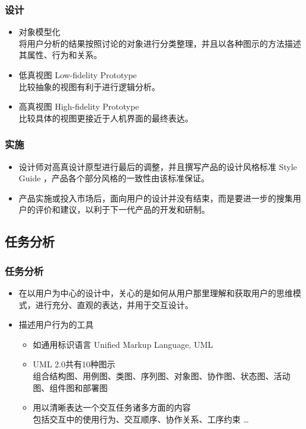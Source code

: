 \documentclass{beamer}
\begin{document}
\begin{frame}
	\frametitle{设计}
	\begin{itemize}
		\item 对象模型化\\{\tiny 将用户分析的结果按照讨论的对象进行分类整理，并且以各种图示的方法描述其属性、行为和关系。}
		\item 低真视图 Low-fidelity Prototype\\{\tiny 比较抽象的视图有利于进行逻辑分析。}
		\item 高真视图 High-fidelity Prototype\\{\tiny 比较具体的视图更接近于人机界面的最终表达。}
	\end{itemize}
\end{frame}

\begin{frame}
	\frametitle{实施}
	\begin{itemize}
		\item 设计师对高真设计原型进行最后的调整，并且撰写产品的设计风格标准 Style Guide ，产品各个部分风格的一致性由该标准保证。
		\item 产品实施或投入市场后，面向用户的设计并没有结束，而是要进一步的搜集用户的评价和建议，以利于下一代产品的开发和研制。
	\end{itemize}
\end{frame}

\subsection{任务分析}
\begin{frame}
	\frametitle{任务分析}
	\begin{itemize}
		\item 在以用户为中心的设计中，关心的是如何从用户那里理解和获取用户的思维模式，进行充分、直观的表达，并用于交互设计。
		\item 描述用户行为的工具
		\begin{itemize}
			\item 如通用标识语言 Unified Markup Language, UML~\cite{bjerkander2003architecting}
			\item UML 2.0共有10种图示\\{\tiny 组合结构图、用例图、类图、序列图、对象图、协作图、状态图、活动图、组件图和部署图}
			\item 用以清晰表达一个交互任务诸多方面的内容\\{\tiny 包括交互中的使用行为、交互顺序、协作关系、工序约束 \dots} %
		\end{itemize}
	\end{itemize}
\end{frame}
\end{document}
